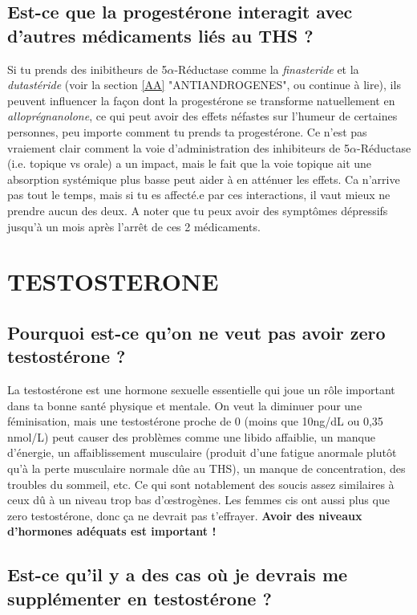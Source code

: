 \documentclass{article}
\begin{document}
\subsection{Est-ce que la progestérone interagit avec d'autres médicaments liés au THS ?}\label{8-18}

Si tu prends des inibitheurs de 5$\alpha$-Réductase comme la \textit{finasteride} et la \textit{dutastéride} (voir la section \ref{AA} "ANTIANDROGENES", ou continue à lire), ils peuvent influencer la façon dont la progestérone se transforme natuellement en \textit{alloprégnanolone}, ce qui peut avoir des effets néfastes sur l'humeur de certaines personnes, peu importe comment tu prends ta progestérone. Ce n'est pas vraiement clair comment la voie d'administration des inhibiteurs de 5$\alpha$-Réductase (i.e. topique vs orale) a un impact, mais le fait que la voie topique ait une absorption systémique plus basse peut aider à en atténuer les effets. Ca n'arrive pas tout le temps, mais si tu es affecté.e par ces interactions, il vaut mieux ne prendre aucun des deux. A noter que tu peux avoir des symptômes dépressifs jusqu'à un mois après l'arrêt de ces 2 médicaments.

\section{TESTOSTERONE}\label{T}

\subsection{Pourquoi est-ce qu'on ne veut pas avoir zero testostérone ?}

La testostérone est une hormone sexuelle essentielle qui joue un rôle important dans ta bonne santé physique et mentale. On veut la diminuer pour une féminisation, mais une testostérone proche de 0 (moins que 10ng/dL ou 0,35 nmol/L) peut causer des problèmes comme une libido affaiblie, un manque d'énergie, un affaiblissement musculaire (produit d'une fatigue anormale plutôt qu'à la perte musculaire normale dûe au THS), un manque de concentration, des troubles du sommeil, etc. Ce qui sont notablement des soucis assez similaires à ceux dû à un niveau trop bas d'œstrogènes. Les femmes cis ont aussi plus que zero testostérone, donc ça ne devrait pas t'effrayer. \textbf{Avoir des niveaux d'hormones adéquats est important !}

\subsection{Est-ce qu'il y a des cas où je devrais me supplémenter en testostérone ?}\label{9-2}
\end{document}
